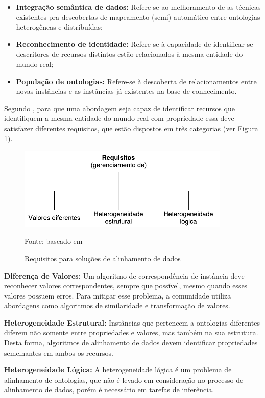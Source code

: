 \begin{itemize}
	\item \textbf{Integração semântica de dados:} Refere-se ao melhoramento de as técnicas existentes pra descobertas de mapeamento (semi) automático entre ontologias heterogêneas e distribuídas; 
	\item \textbf{Reconhecimento de identidade:} Refere-se à capacidade de identificar se descritores de recursos distintos estão relacionados à mesma entidade do mundo real; 
	\item\textbf{ População de ontologias:} Refere-se à descoberta de relacionamentos entre novas instâncias e as instâncias já existentes na base de conhecimento. 
\end{itemize}

Segundo , para que uma abordagem seja capaz de identificar recursos que identifiquem a mesma entidade do mundo real com propriedade essa deve satisfazer diferentes requisitos, que estão  dispostos em três categorias (ver Figura \ref{fig:imrequirements}).

\begin{figure}[!ht]
	\centering
	\includegraphics[width=0.9\textwidth]{./imagens/im_requirements.pdf}
    \caption{Requisitos para soluções de alinhamento de dados}
	\footnotesize{Fonte: baseado em \cite{ferrara2008towards}}
	\label{fig:imrequirements}
\end{figure}

\textbf{Diferença de Valores:}
Um algoritmo de correspondência de instância deve reconhecer valores correspondentes, sempre que possível, mesmo quando esses valores possuem erros. Para mitigar esse problema, a comunidade utiliza abordagens como algoritmos de similaridade e transformação de valores.


\textbf{Heterogeneidade Estrutural:}
Instâncias que pertencem a ontologias diferentes diferem não somente entre propriedades e valores, mas também na sua estrutura. Desta forma, algoritmos de alinhamento de dados devem identificar propriedades semelhantes em ambos os recursos.


\textbf{Heterogeneidade Lógica:}
A heterogeneidade lógica é um problema de alinhamento de ontologias, que não é levado em consideração no processo de alinhamento de dados, porém é necessário em tarefas de inferência.

